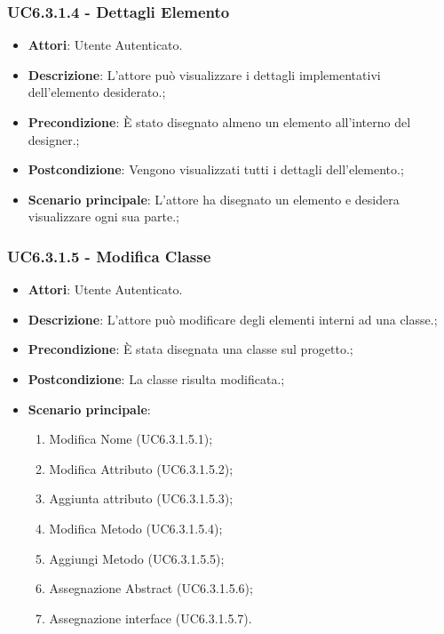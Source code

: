 \subsubsection{UC6.3.1.4 - Dettagli Elemento} 
\label{sssec:UC6.3.1.4} 
\begin{itemize} 
\item \textbf{Attori}: Utente Autenticato.
\item \textbf{Descrizione}: L'attore può visualizzare i dettagli implementativi dell'elemento desiderato.;
\item \textbf{Precondizione}: È stato disegnato almeno un elemento all'interno del designer.;
\item \textbf{Postcondizione}: Vengono visualizzati tutti i dettagli dell'elemento.;
\item \textbf{Scenario principale}: L'attore ha disegnato un elemento e desidera visualizzare ogni sua parte.;\end{itemize} 
\subsubsection{UC6.3.1.5 - Modifica Classe} 
\label{sssec:UC6.3.1.5} 
\begin{itemize} 
\item \textbf{Attori}: Utente Autenticato.
\item \textbf{Descrizione}: L'attore può modificare degli elementi interni ad una classe.;
\item \textbf{Precondizione}: È stata disegnata una classe sul progetto.;
\item \textbf{Postcondizione}: La classe risulta modificata.;
\item \textbf{Scenario principale}: \begin{enumerate}\item Modifica Nome (UC6.3.1.5.1);\item Modifica Attributo (UC6.3.1.5.2);\item Aggiunta attributo (UC6.3.1.5.3);\item Modifica Metodo (UC6.3.1.5.4);\item Aggiungi Metodo (UC6.3.1.5.5);\item Assegnazione Abstract (UC6.3.1.5.6);\item Assegnazione interface (UC6.3.1.5.7). 
 \end{enumerate}
\end{itemize} 
